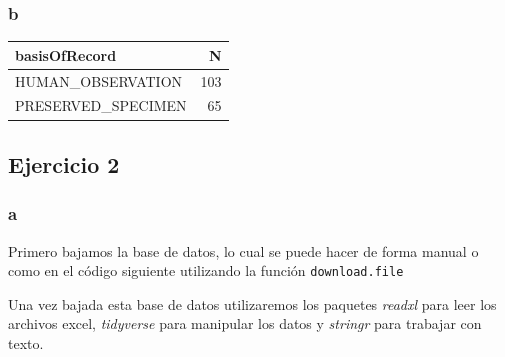 \documentclass[]{book}
\newenvironment{Shaded}{\begin{snugshade}}{\end{snugshade}}
\newcommand{\DataTypeTok}[1]{\textcolor[rgb]{0.13,0.29,0.53}{#1}}
\newcommand{\KeywordTok}[1]{\textcolor[rgb]{0.13,0.29,0.53}{\textbf{#1}}}
\newcommand{\NormalTok}[1]{#1}
\newcommand{\OperatorTok}[1]{\textcolor[rgb]{0.81,0.36,0.00}{\textbf{#1}}}
\newcommand{\StringTok}[1]{\textcolor[rgb]{0.31,0.60,0.02}{#1}}
\begin{document}
\hypertarget{b}{%
\subsubsection{b}\label{b}}

\begin{Shaded}
\end{Shaded}

\begin{tabular}{l|r}
\hline
basisOfRecord & N\\
\hline
HUMAN\_OBSERVATION & 103\\
\hline
PRESERVED\_SPECIMEN & 65\\
\hline
\end{tabular}

\hypertarget{ejercicio-2-3}{%
\subsection{Ejercicio 2}\label{ejercicio-2-3}}

\hypertarget{a-1}{%
\subsubsection{a}\label{a-1}}

Primero bajamos la base de datos, lo cual se puede hacer de forma manual
o como en el código siguiente utilizando la función
\texttt{download.file}

\begin{Shaded}
\end{Shaded}

Una vez bajada esta base de datos utilizaremos los paquetes
\emph{readxl} para leer los archivos excel, \emph{tidyverse} para
manipular los datos y \emph{stringr} para trabajar con texto.
\end{document}
